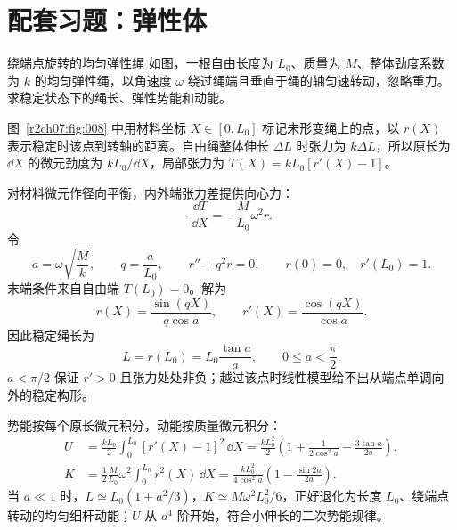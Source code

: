 \section{配套习题：弹性体}
\label{r2ch07:sec:practice}

\begin{practicebox}{绕端点旋转的均匀弹性绳}
如图，一根自由长度为 $L_0$、质量为 $M$、整体劲度系数为 $k$ 的均匀弹性绳，以角速度 $\omega$ 绕过绳端且垂直于绳的轴匀速转动，忽略重力。求稳定状态下的绳长、弹性势能和动能。
\label{r2ch07:pr:001}
\begin{solution}
图~\ref{r2ch07:fig:008} 中用材料坐标 $X\in[0,L_0]$ 标记未形变绳上的点，以 $r(X)$ 表示稳定时该点到转轴的距离。自由绳整体伸长 $\Delta L$ 时张力为 $k\Delta L$，所以原长为 $\dd X$ 的微元劲度为 $kL_0/\dd X$，局部张力为
$T(X)=kL_0[r'(X)-1]$。

对材料微元作径向平衡，内外端张力差提供向心力：
\[
 \frac{\dd T}{\dd X}=-\frac{M}{L_0}\omega^2r.
\]
令
\begin{equation}
 a=\omega\sqrt{\frac Mk},\qquad q=\frac a{L_0},\qquad
 r''+q^2r=0,\qquad r(0)=0,\quad r'(L_0)=1.
 \label{r2ch07:eq:026}
\end{equation}
末端条件来自自由端 $T(L_0)=0$。解为
\[
 r(X)=\frac{\sin(qX)}{q\cos a},\qquad
 r'(X)=\frac{\cos(qX)}{\cos a}.
\]
因此稳定绳长为
\begin{equation}
 \boxed{L=r(L_0)=L_0\frac{\tan a}{a}},
 \qquad 0\le a<\frac\pi2.
 \label{r2ch07:eq:027}
\end{equation}
$a<\pi/2$ 保证 $r'>0$ 且张力处处非负；越过该点时线性模型给不出从端点单调向外的稳定构形。

势能按每个原长微元积分，动能按质量微元积分：
\begin{equation}
 \begin{aligned}
 U&=\frac{kL_0}{2}\int_0^{L_0}[r'(X)-1]^2\,\dd X
 =\frac{kL_0^2}{2}\left(1+\frac{1}{2\cos^2a}
 -\frac{3\tan a}{2a}\right),\\
 K&=\frac12\frac{M}{L_0}\omega^2\int_0^{L_0}r^2(X)\,\dd X
 =\frac{kL_0^2}{4\cos^2a}\left(1-\frac{\sin2a}{2a}\right).
 \end{aligned}
 \label{r2ch07:eq:028}
\end{equation}
当 $a\ll1$ 时，$L\simeq L_0(1+a^2/3)$，$K\simeq M\omega^2L_0^2/6$，正好退化为长度 $L_0$、绕端点转动的均匀细杆动能；$U$ 从 $a^4$ 阶开始，符合小伸长的二次势能规律。
\figRotatingRope
\end{solution}
\end{practicebox}

